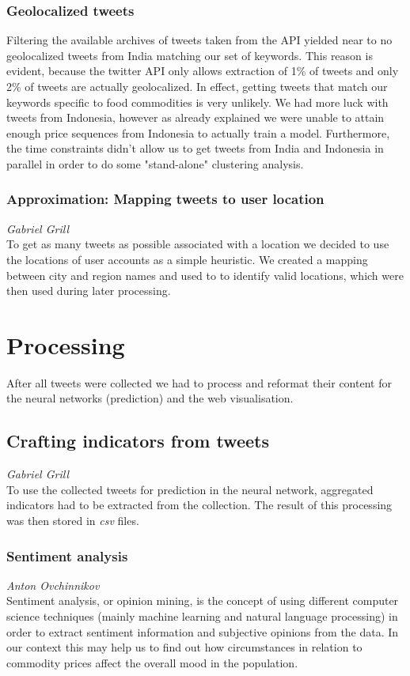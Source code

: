 \subsubsection*{Geolocalized tweets}
Filtering the available archives of tweets taken from the API yielded near to no geolocalized tweets from India matching our set of keywords. This reason is evident, because the twitter API only allows extraction of 1\% of tweets and only 2\% of tweets are actually geolocalized. In effect, getting tweets that match our keywords specific to food commodities is very unlikely. We had more luck with tweets from Indonesia, however as already explained we were unable to attain enough price sequences from Indonesia to actually train a model. Furthermore, the time constraints didn't allow us to get tweets from India and Indonesia in parallel in order to do some "stand-alone" clustering analysis.

\subsubsection*{Approximation: Mapping tweets to user location}
\emph{Gabriel Grill} \\
To get as many tweets as possible associated with a location we decided to use the locations of user accounts as a simple heuristic. We created a mapping between city and region names and used to to identify valid locations, which were then used during later processing.

\section*{Processing}
After all tweets were collected we had to process and reformat their content for the neural networks (prediction) and the web visualisation.

\subsection*{Crafting indicators from tweets}
\emph{Gabriel Grill} \\
To use the collected tweets for prediction in the neural network, aggregated indicators had to be extracted from the collection. The result of this processing was then stored in \emph{csv} files.

\subsubsection*{Sentiment analysis}
\emph{Anton Ovchinnikov} \\
Sentiment analysis, or opinion mining, is the concept of using different computer science techniques (mainly machine learning and natural language processing) in order to extract sentiment information and subjective opinions from the data. In our context this may help us to find out how circumstances in relation to commodity prices affect the overall mood in the population.

